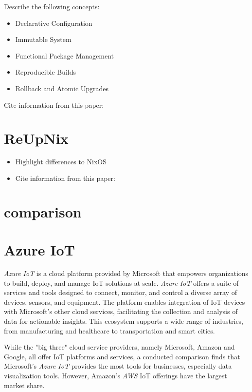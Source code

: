 \begin{tcolorbox}[title=TODO]
Describe the following concepts:
\begin{itemize}
    \item Declarative Configuration
    \item Immutable System
    \item Functional Package Management
    \item Reproducible Builds
    \item Rollback and Atomic Upgrades
\end{itemize}

    Cite information from this paper: \cite{1411255}
\end{tcolorbox}

\section{ReUpNix}

\begin{tcolorbox}[title=TODO]
    \begin{itemize}
        \item Highlight differences to NixOS
        \item Cite information from this paper: \cite{gollenstede:23:lctes}
    \end{itemize}
\end{tcolorbox}

\section{comparison}

\section{Azure IoT}
\textit{Azure IoT} is a cloud platform provided by Microsoft that
empowers organizations to build, deploy, and manage \ac{IoT} solutions at scale.
\textit{Azure IoT} offers a suite of services and tools designed to connect,
monitor, and control a diverse array of devices, sensors, and equipment. The
platform enables integration of \ac{IoT} devices with Microsoft's other cloud
services, facilitating the collection and analysis of data for actionable insights.
This ecosystem supports a wide range of industries, from manufacturing and
healthcare to transportation and smart cities\cite{msdoc-aziot}.

While the "big three" cloud service providers, namely Microsoft, Amazon and
Google, all offer \ac{IoT} platforms and services, a conducted comparison finds
that Microsoft's \textit{Azure IoT} provides the most tools for businesses,
especially data visualization tools. However, Amazon's \textit{AWS} \ac{IoT}
offerings have the largest market share\cite{9116254}.

